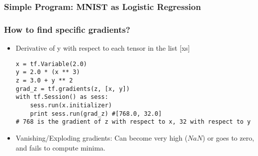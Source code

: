 \begin{frame}[fragile] \frametitle{Simple Program: MNIST as Logistic Regression}

\hfill
{}

\end{frame}


\begin{frame}[fragile] \frametitle{How to find specific gradients?}
\begin{itemize}
\item  Derivative of y with respect to each tensor in the list [xs]
\begin{lstlisting}
x = tf.Variable(2.0)
y = 2.0 * (x ** 3)
z = 3.0 + y ** 2
grad_z = tf.gradients(z, [x, y])
with tf.Session() as sess:
	sess.run(x.initializer)
	print sess.run(grad_z) #[768.0, 32.0]
# 768 is the gradient of z with respect to x, 32 with respect to y
\end{lstlisting}
\item Vanishing/Exploding gradients: Can become very high ($NaN$) or goes to zero, and fails to compute minima.
\end{itemize}
\end{frame}


